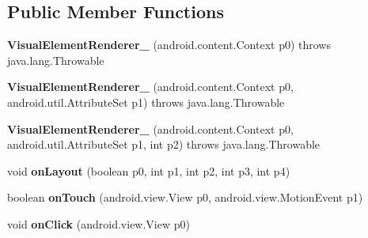 \subsection*{Public Member Functions}
\begin{DoxyCompactItemize}
\item 
\hypertarget{classmd5282f1122c1313907b9bf274dd2c2f344_1_1VisualElementRenderer__1_a353cf41a5905545e036c68849e7ced22}{}{\bfseries Visual\+Element\+Renderer\+\_} (android.\+content.\+Context p0)  throws java.\+lang.\+Throwable 	\label{classmd5282f1122c1313907b9bf274dd2c2f344_1_1VisualElementRenderer__1_a353cf41a5905545e036c68849e7ced22}

\item 
\hypertarget{classmd5282f1122c1313907b9bf274dd2c2f344_1_1VisualElementRenderer__1_a5b4df673e1cafbaa5a147e054f02776f}{}{\bfseries Visual\+Element\+Renderer\+\_} (android.\+content.\+Context p0, android.\+util.\+Attribute\+Set p1)  throws java.\+lang.\+Throwable 	\label{classmd5282f1122c1313907b9bf274dd2c2f344_1_1VisualElementRenderer__1_a5b4df673e1cafbaa5a147e054f02776f}

\item 
\hypertarget{classmd5282f1122c1313907b9bf274dd2c2f344_1_1VisualElementRenderer__1_a117d9de2c9990b98c4f72f4c86f26bc4}{}{\bfseries Visual\+Element\+Renderer\+\_} (android.\+content.\+Context p0, android.\+util.\+Attribute\+Set p1, int p2)  throws java.\+lang.\+Throwable 	\label{classmd5282f1122c1313907b9bf274dd2c2f344_1_1VisualElementRenderer__1_a117d9de2c9990b98c4f72f4c86f26bc4}

\item 
\hypertarget{classmd5282f1122c1313907b9bf274dd2c2f344_1_1VisualElementRenderer__1_aaeabc458c5599ee309e3e254f350d315}{}void {\bfseries on\+Layout} (boolean p0, int p1, int p2, int p3, int p4)\label{classmd5282f1122c1313907b9bf274dd2c2f344_1_1VisualElementRenderer__1_aaeabc458c5599ee309e3e254f350d315}

\item 
\hypertarget{classmd5282f1122c1313907b9bf274dd2c2f344_1_1VisualElementRenderer__1_aea97d952f53e6aa20f0a9cb1139f66ef}{}boolean {\bfseries on\+Touch} (android.\+view.\+View p0, android.\+view.\+Motion\+Event p1)\label{classmd5282f1122c1313907b9bf274dd2c2f344_1_1VisualElementRenderer__1_aea97d952f53e6aa20f0a9cb1139f66ef}

\item 
\hypertarget{classmd5282f1122c1313907b9bf274dd2c2f344_1_1VisualElementRenderer__1_acb4aab59d69f4a494e9ef7b7127b2895}{}void {\bfseries on\+Click} (android.\+view.\+View p0)\label{classmd5282f1122c1313907b9bf274dd2c2f344_1_1VisualElementRenderer__1_acb4aab59d69f4a494e9ef7b7127b2895}


\end{DoxyCompactItemize}
